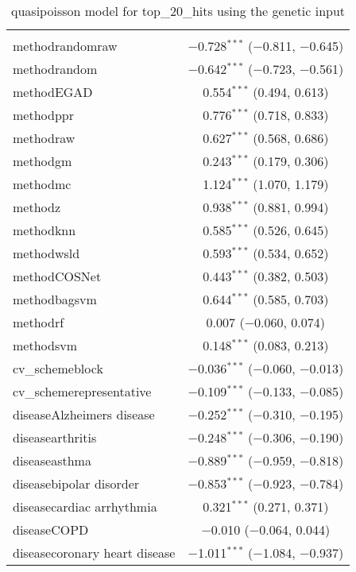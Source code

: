 
\begin{table}[!htbp] \centering 
  \caption{quasipoisson model for top_20_hits using the genetic input} 
  \label{} 
\begin{tabular}{@{\extracolsep{5pt}}lc} 
\\[-1.8ex]\hline 
\hline \\[-1.8ex] 
 methodrandomraw & $-$0.728$^{***}$ ($-$0.811, $-$0.645) \\ 
  methodrandom & $-$0.642$^{***}$ ($-$0.723, $-$0.561) \\ 
  methodEGAD & 0.554$^{***}$ (0.494, 0.613) \\ 
  methodppr & 0.776$^{***}$ (0.718, 0.833) \\ 
  methodraw & 0.627$^{***}$ (0.568, 0.686) \\ 
  methodgm & 0.243$^{***}$ (0.179, 0.306) \\ 
  methodmc & 1.124$^{***}$ (1.070, 1.179) \\ 
  methodz & 0.938$^{***}$ (0.881, 0.994) \\ 
  methodknn & 0.585$^{***}$ (0.526, 0.645) \\ 
  methodwsld & 0.593$^{***}$ (0.534, 0.652) \\ 
  methodCOSNet & 0.443$^{***}$ (0.382, 0.503) \\ 
  methodbagsvm & 0.644$^{***}$ (0.585, 0.703) \\ 
  methodrf & 0.007 ($-$0.060, 0.074) \\ 
  methodsvm & 0.148$^{***}$ (0.083, 0.213) \\ 
  cv\_schemeblock & $-$0.036$^{***}$ ($-$0.060, $-$0.013) \\ 
  cv\_schemerepresentative & $-$0.109$^{***}$ ($-$0.133, $-$0.085) \\ 
  diseaseAlzheimers disease & $-$0.252$^{***}$ ($-$0.310, $-$0.195) \\ 
  diseasearthritis & $-$0.248$^{***}$ ($-$0.306, $-$0.190) \\ 
  diseaseasthma & $-$0.889$^{***}$ ($-$0.959, $-$0.818) \\ 
  diseasebipolar disorder & $-$0.853$^{***}$ ($-$0.923, $-$0.784) \\ 
  diseasecardiac arrhythmia & 0.321$^{***}$ (0.271, 0.371) \\ 
  diseaseCOPD & $-$0.010 ($-$0.064, 0.044) \\ 
  diseasecoronary heart disease & $-$1.011$^{***}$ ($-$1.084, $-$0.937) \\ 

\end{tabular}
\end{table}
